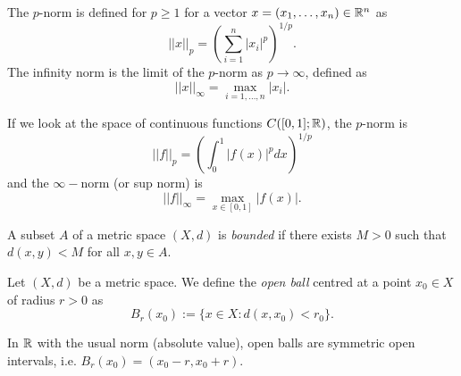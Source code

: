 \documentclass{article}
\begin{document}
\begin{example}
\label{p-norm} 
The $p$-norm is defined for $p \geq 1$ for a vector $x = (x_1, \ldots, x_n) \in {\mathbb{R}}^n$ as
\begin{equation*}
    ||x||_p = \left( \sum_{i=1}^n |x_i|^p \right)^{1/p}.
\end{equation*}
The infinity norm is the limit of the $p$-norm as $p \to \infty$, defined as
\begin{equation*}
    ||x||_\infty = \max_{i=1,\ldots, n} |x_i|.
\end{equation*}

If we look at the space of continuous functions $C([0,1];{\mathbb{R}})$, the $p$-norm is 
\begin{equation*}
    ||f||_p = \left( \int_0^1 |f(x)|^p dx \right)^{1/p}
\end{equation*}
and the $\infty-$norm (or sup norm) is 
\begin{equation*}
    ||f||_\infty = \max_{x \in [0,1]} |f(x)|.
\end{equation*}
\end{example}

\begin{definition}
A subset $A$ of a metric space $(X,d)$ is \emph{bounded} if there exists $M>0$ such that $d(x,y) < M$ for all $x,y \in A$. 
\end{definition}

\begin{definition}
Let $(X,d)$ be a metric space. We define the \emph{open ball} centred at a point $x_0 \in X$ of radius $r > 0$ as
\begin{equation*}
    B_r(x_0) := \{x \in X : d(x,x_0) < r_0 \}.
\end{equation*}
\end{definition}

\begin{example}
In ${\mathbb{R}}$ with the usual norm (absolute value), open balls are symmetric open intervals, i.e. $B_r(x_0) = (x_0-r,x_0+r)$.
\end{example}
\end{document}
